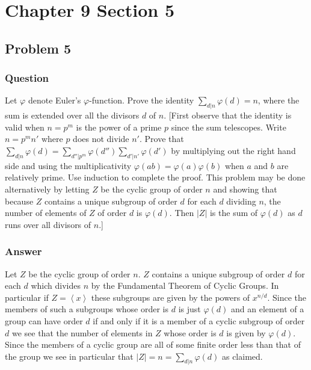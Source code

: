 \documentclass[12pt]{article}
\begin{document}
\section{Chapter 9 Section 5}
\subsection{Problem 5}

\subsubsection{Question}
Let $\varphi$ denote Euler's $\varphi$-function. Prove the identity $\sum_{d|n}\varphi(d) = n$, where the sum is extended over all the divisors $d$ of $n$. [First observe that the identity is valid when $n=p^m$ is the power of a prime $p$ since the sum telescopes. Write $n=p^m n'$ where $p$ does not divide $n'$. Prove that $\sum_{d|n}\varphi (d) = \sum_{d''|p^m}\varphi(d'')\sum_{d'|n'} \varphi(d')$ by multiplying out the right hand side and using the multiplicativity $\varphi(ab)=\varphi(a)\varphi(b)$ when $a$ and $b$ are relatively prime. Use induction to complete the proof. This problem may be done alternatively by letting $Z$ be the cyclic group of order $n$ and showing that because $Z$ contains a unique subgroup of order $d$ for each $d$ dividing $n$, the number of elements of $Z$ of order $d$ is $\varphi(d)$. Then $|Z|$ is the sum of $\varphi(d)$ as $d$ runs over all divisors of $n$.]
\subsubsection{Answer}
Let $Z$ be the cyclic group of order $n$. $Z$ contains a unique subgroup of order $d$ for each $d$ which divides $n$ by the Fundamental Theorem of Cyclic Groups. In particular if $Z = \left< x \right>$ these subgroups are given by the powers of $x^{n/d}$. Since the members of such a  subgroups whose order is $d$ is just $\varphi(d)$ and an element of a group can have order $d$ if and only if it is a member of a cyclic subgroup of order $d$ we see that the number of elements in $Z$ whose order is $d$ is given by $\varphi(d)$. Since the members of a cyclic group are all of some finite order less than that of the group we see in particular that $|Z|=n=\sum_{d|n}\varphi(d)$ as claimed.
\end{document}

